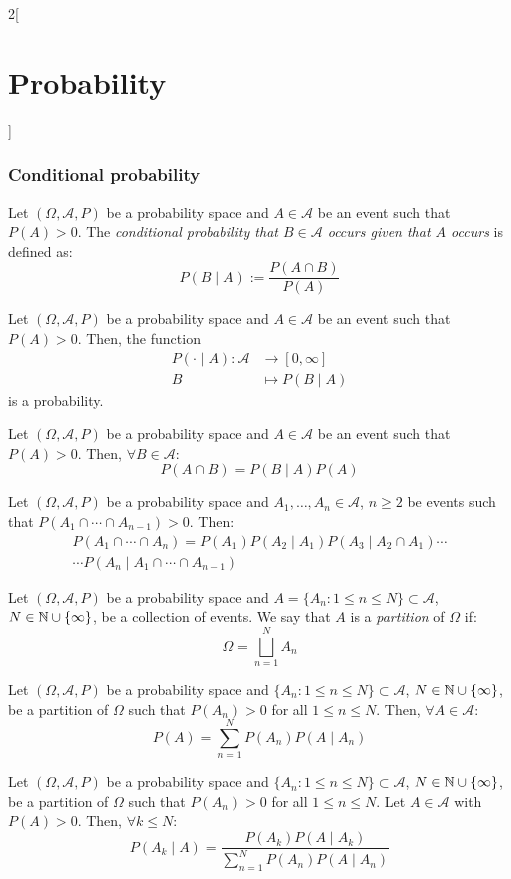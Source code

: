 \documentclass[../../../main.tex]{subfiles}
\begin{document}
\begin{multicols}{2}[\section{Probability}]
  \subsubsection{Conditional probability}
  \begin{definition}
    Let $(\Omega,\mathcal{A},P)$ be a probability space and $A\in\mathcal{A}$ be an event such that $P(A)>0$. The \textit{conditional probability that $B\in\mathcal{A}$ occurs given that $A$ occurs} is defined as: $$P(B\mid A):=\frac{P(A\cap B)}{P(A)}$$
  \end{definition}
  \begin{prop}
    Let $(\Omega,\mathcal{A},P)$ be a probability space and $A\in\mathcal{A}$ be an event such that $P(A)>0$. Then, the function
    \begin{align*}
      P(\cdot\mid A):\mathcal{A} & \longrightarrow [0,\infty] \\
      B                          & \longmapsto P(B\mid A)
    \end{align*}
    is a probability.
  \end{prop}
  \begin{prop}
    Let $(\Omega,\mathcal{A},P)$ be a probability space and $A\in\mathcal{A}$ be an event such that $P(A)>0$. Then, $\forall B\in\mathcal{A}$: $$P(A\cap B)=P(B\mid A)P(A)$$
  \end{prop}
  \begin{prop}
    Let $(\Omega,\mathcal{A},P)$ be a probability space and $A_1,\ldots,A_n\in\mathcal{A}$, $n\geq 2$ be events such that $P(A_1\cap\cdots\cap A_{n-1})>0$. Then:
    \begin{multline*}
      P(A_1\cap\cdots\cap A_n)=P(A_1)P(A_2\mid A_1)P(A_3\mid A_2\cap A_1)\cdots\\\cdots P(A_n\mid A_1\cap\cdots\cap A_{n-1})
    \end{multline*}
  \end{prop}
  \begin{definition}
    Let $(\Omega,\mathcal{A},P)$ be a probability space and $A=\{A_n:1\leq n\leq N\}\subset\mathcal{A}$, $N\in\mathbb{N}\cup\{\infty\}$, be a collection of events. We say that $A$ is a \textit{partition} of $\Omega$ if: $$\Omega=\bigsqcup_{n=1}^NA_n$$
  \end{definition}
  \begin{prop}
    Let $(\Omega,\mathcal{A},P)$ be a probability space and $\{A_n:1\leq n\leq N\}\subset\mathcal{A}$, $N\in\mathbb{N}\cup\{\infty\}$, be a partition of $\Omega$ such that $P(A_n)>0$ for all $1\leq n\leq N$. Then, $\forall A\in\mathcal{A}$: $$P(A)=\sum_{n=1}^NP(A_n)P(A\mid A_n)$$
  \end{prop}
  \begin{prop}
    Let $(\Omega,\mathcal{A},P)$ be a probability space and $\{A_n:1\leq n\leq N\}\subset\mathcal{A}$, $N\in\mathbb{N}\cup\{\infty\}$, be a partition of $\Omega$ such that $P(A_n)>0$ for all $1\leq n\leq N$. Let $A\in\mathcal{A}$ with $P(A)>0$. Then, $\forall k\leq N$: $$P(A_k\mid A)=\frac{P(A_k)P(A\mid A_k)}{\sum_{n=1}^NP(A_n)P(A\mid A_n)}$$
  \end{prop}

\end{multicols}
\end{document}
